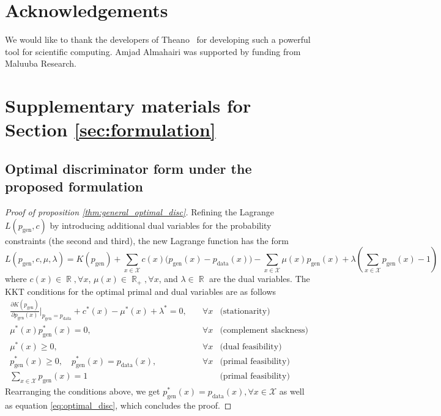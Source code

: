\documentclass[a4paper]{article}
\newcommand{\pd}{p_\text{data}}
\newcommand{\pg}{p_\text{gen}}
\DeclareMathOperator{\R}{\mathbb{R}}
\begin{document}
 \section{Acknowledgements}
We would like to thank the developers of Theano~\citep{2016arXiv160502688short} for developing such a powerful tool for scientific computing. Amjad Almahairi was supported by funding from Maluuba Research. 
\newpage




\newpage

\appendix

\section{Supplementary materials for Section \ref{sec:formulation}}
\subsection{Optimal discriminator form under the proposed formulation}
\label{sec:proof_for_formulation}

\begin{proof}[Proof of proposition \ref{thm:general_optimal_disc}]
Refining the Lagrange $L(\pg, c)$ by introducing additional dual variables for the probability constraints (the second and third), the new Lagrange function has the form
\begin{equation}
\label{eq:lagrange_form}
L(\pg, c, \mu, \lambda) = K(\pg) + \sum_{x \in \mathcal{X}} c(x) \Big( \pg(x) - \pd(x) \Big) - \sum_{x \in \mathcal{X}} \mu(x)\pg(x)  + \lambda (\sum_{x \in \mathcal{X}} \pg(x) - 1)
\end{equation}
where $c(x) \in \R, \forall x$, $\mu(x) \in \R_{+},\forall x$, and $\lambda \in \R$ are the dual variables.
The KKT conditions for the optimal primal and dual variables are as follows
\begin{equation}
\begin{aligned}
	\frac{\partial K(\pg)}{\partial \pg(x)}\bigg|_{\pg=\pd} + c^*(x) - \mu^*(x) + \lambda^* = 0,& \quad\forall x & \text{(stationarity)} \\
	\mu^*(x) \pg^*(x) = 0, &\quad\forall x & \text{(complement slackness)} \\
    \mu^*(x) \geq 0, &\quad\forall x & \text{(dual feasibility)} \\
	\pg^*(x) \geq 0, \quad \pg^*(x) = \pd(x), &\quad\forall x & \text{(primal feasibility)} \\
	\sum_{x \in \mathcal{X}} \pg(x) = 1 && \text{(primal feasibility)}
\end{aligned}
\end{equation}
Rearranging the conditions above, we get $\pg^*(x) = \pd(x), \forall x \in \mathcal{X}$ as well as equation \eqref{eq:optimal_disc}, which concludes the proof.
\end{proof}
\end{document}
